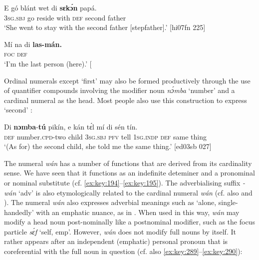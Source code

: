 \ea%
    \label{ex:key:254}
    \gll E    gó  blánt  wet    di  \textbf{sɛkɔ́n}  papá.\\
\textsc{3sg}.\textsc{sbj}  go  reside  with    \textsc{def}  second  father\\

\glt ‘She went to stay with the second father [stepfather].’ [hi07fn 225]
\z


\ea%
    \label{ex:key:255}
    \gll Mí    na  di  \textbf{las-mán}\textbf{\textmd{.}}\\
  \textsc{foc}  \textsc{def}  \\

\glt ‘I’m the last person (here).’ [\textstylePichiexamplenumberZchnZchn{nn07fn 234]}
\z

Ordinal numerals except ‘first’ may also be formed productively through the use of quantifier compounds involving the modifier noun \textit{nɔ́mba} ‘number’ and a cardinal numeral as the head. Most people also use this construction to express ‘second’ :


\ea%
    \label{ex:key:256}
    \gll Di  \textbf{nɔmba}-\textbf{tú}    pikín,  e    kán  tɛ́l  mí    di  sén    tín.\\
\textsc{def}  number.\textsc{cpd}{}-two  child  \textsc{3sg.sbj}  \textsc{pfv}  tell  \textsc{1sg.indp}  \textsc{def}  same  thing\\

\glt ‘(As for) the second child, she told me the same thing.’ [ed03sb 027]
\z

The numeral \textit{wán} has a number of functions that are derived from its cardinality sense. We have seen that it functions as an indefinite deteminer and a pronominal or nominal substitute (cf. \ref{ex:key:194}–\ref{ex:key:195}). The adverbialising suffix \textit{-wán} ‘adv’ is also etymologically related to the cardinal numeral \textit{wán} (cf. also  and ). The numeral \textit{wán} also expresses adverbial meanings such as ‘alone, single-handedly’ with an emphatic{\fff} nuance, as in . When used in this way, \textit{wán} may modify a head noun post-nominally like a postnominal modifier, such as the focus particle \textit{sɛ́f} ‘self, emp’. However, \textit{wán} does not modify full nouns by itself. It rather appears after an independent (emphatic) personal pronoun that is coreferential with the full noun in question  (cf. also \ref{ex:key:289}–\ref{ex:key:290}):


